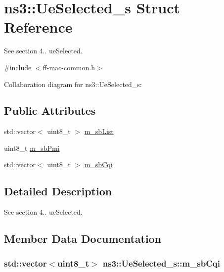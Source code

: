 \hypertarget{structns3_1_1UeSelected__s}{}\section{ns3\+:\+:Ue\+Selected\+\_\+s Struct Reference}
\label{structns3_1_1UeSelected__s}


See section 4.. ue\+Selected.  




{\ttfamily \#include $<$ff-\/mac-\/common.\+h$>$}



Collaboration diagram for ns3\+:\+:Ue\+Selected\+\_\+s\+:
\subsection*{Public Attributes}
\begin{DoxyCompactItemize}
\item 
std\+::vector$<$ uint8\+\_\+t $>$ \hyperlink{structns3_1_1UeSelected__s_a34bbedfcad9497603397fbe297c27fbc}{m\+\_\+sb\+List}
\item 
uint8\+\_\+t \hyperlink{structns3_1_1UeSelected__s_a983b6e93c019fee548d854edb2e9889c}{m\+\_\+sb\+Pmi}
\item 
std\+::vector$<$ uint8\+\_\+t $>$ \hyperlink{structns3_1_1UeSelected__s_accd97ac10deeff15959e4e80579c4319}{m\+\_\+sb\+Cqi}
\end{DoxyCompactItemize}


\subsection{Detailed Description}
See section 4.. ue\+Selected. 

\subsection{Member Data Documentation}
\subsubsection[{\texorpdfstring{m\+\_\+sb\+Cqi}{m_sbCqi}}]{\setlength{\rightskip}{0pt plus 5cm}std\+::vector$<$uint8\+\_\+t$>$ ns3\+::\+Ue\+Selected\+\_\+s\+::m\+\_\+sb\+Cqi}\hypertarget{structns3_1_1UeSelected__s_accd97ac10deeff15959e4e80579c4319}{}\label{structns3_1_1UeSelected__s_accd97ac10deeff15959e4e80579c4319}

